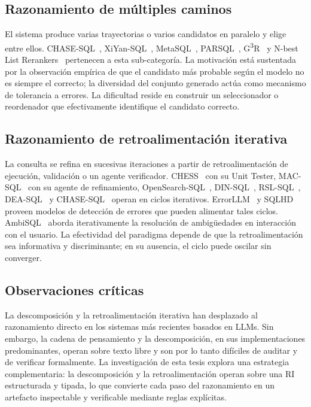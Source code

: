 \subsection{Razonamiento de múltiples caminos}
\label{subsec:sota-d5-multipath}

El sistema produce varias trayectorias o varios candidatos en paralelo y
elige entre ellos. CHASE-SQL~\cite{CHASE-SQL2025},
XiYan-SQL~\cite{XiYan-SQL2024}, MetaSQL~\cite{MetaSQL2024},
PARSQL~\cite{PARSQL2025}, G\textsuperscript{3}R~\cite{G3R2023} y
N-best List Rerankers~\cite{N-bestListRerankers2022} pertenecen a esta
sub-categoría. La motivación está sustentada por la observación
empírica de que el candidato más probable según el modelo no es
siempre el correcto; la diversidad del conjunto generado actúa como
mecanismo de tolerancia a errores. La dificultad reside en construir un
seleccionador o reordenador que efectivamente identifique el candidato
correcto.

\subsection{Razonamiento de retroalimentación iterativa}
\label{subsec:sota-d5-iterativo}

La consulta se refina en sucesivas iteraciones a partir de
retroalimentación de ejecución, validación o un agente verificador.
CHESS~\cite{CHESS2024} con su Unit Tester, MAC-SQL~\cite{MAC-SQL2023}
con su agente de refinamiento, OpenSearch-SQL~\cite{OpenSearch-SQL2025},
DIN-SQL~\cite{DIN-SQL2023}, RSL-SQL~\cite{RSL-SQL2024},
DEA-SQL~\cite{DEA-SQL2024} y CHASE-SQL~\cite{CHASE-SQL2025} operan en
ciclos iterativos. ErrorLLM~\cite{errorllm2026} y SQLHD~\cite{SQLHD2025}
proveen modelos de detección de errores que pueden alimentar tales
ciclos. AmbiSQL~\cite{AmbiSQL} aborda iterativamente la resolución de
ambigüedades en interacción con el usuario. La efectividad del
paradigma depende de que la retroalimentación sea informativa y
discriminante; en su ausencia, el ciclo puede oscilar sin converger.

\subsection{Observaciones críticas}
\label{subsec:sota-d5-obs}

La descomposición y la retroalimentación iterativa han desplazado al
razonamiento directo en los sistemas más recientes basados en
\acp{LLM}. Sin embargo, la cadena de pensamiento y la descomposición,
en sus implementaciones predominantes, operan sobre texto libre y son
por lo tanto difíciles de auditar y de verificar formalmente. La
investigación de esta tesis explora una estrategia complementaria: la
descomposición y la retroalimentación operan sobre una RI estructurada
y tipada, lo que convierte cada paso del razonamiento en un artefacto
inspectable y verificable mediante reglas explícitas.


